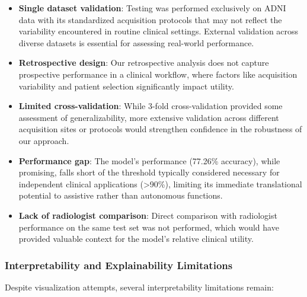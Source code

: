 \documentclass[12pt, a4paper]{article}
\begin{document}
\begin{itemize}
    \item \textbf{Single dataset validation}: Testing was performed exclusively on ADNI data with its standardized acquisition protocols that may not reflect the variability encountered in routine clinical settings. External validation across diverse datasets is essential for assessing real-world performance.
    
    \item \textbf{Retrospective design}: Our retrospective analysis does not capture prospective performance in a clinical workflow, where factors like acquisition variability and patient selection significantly impact utility.
    
    \item \textbf{Limited cross-validation}: While 3-fold cross-validation provided some assessment of generalizability, more extensive validation across different acquisition sites or protocols would strengthen confidence in the robustness of our approach.
    
    \item \textbf{Performance gap}: The model's performance (77.26\% accuracy), while promising, falls short of the threshold typically considered necessary for independent clinical applications (>90\%), limiting its immediate translational potential to assistive rather than autonomous functions.
    
    \item \textbf{Lack of radiologist comparison}: Direct comparison with radiologist performance on the same test set was not performed, which would have provided valuable context for the model's relative clinical utility.
\end{itemize}

\subsubsection{Interpretability and Explainability Limitations}

Despite visualization attempts, several interpretability limitations remain:
\end{document}
